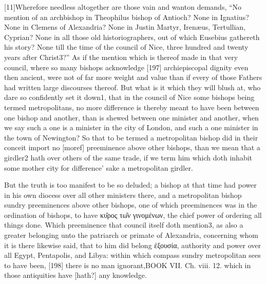 [11]Wherefore needless altogether are those vain and wanton demands, “No mention of an archbishop in Theophilus bishop of Antioch? None in Ignatius? None in Clemens of Alexandria? None in Justin Martyr, Irenæus, Tertullian, Cyprian? None in all those old historiographers, out of which Eusebius gathereth his story? None till the time of the council of Nice, three hundred and twenty years after Christ3?” As if the mention which is thereof made in that very council, where so many bishops acknowledge [197] archiepiscopal dignity even then ancient, were not of far more weight and value than if every of those Fathers had written large discourses thereof. But what is it which they will blush at, who dare so confidently set it down1, that in the council of Nice some bishops being termed metropolitans, no more difference is thereby meant to have been between one bishop and another, than is shewed between one minister and another, when we say such a one is a minister in the city of London, and such a one minister in the town of Newington? So that to be termed a metropolitan bishop did in their conceit import no [moref] preeminence above other bishops, than we mean that a girdler2 hath over others of the same trade, if we term him which doth inhabit some mother city for difference’ sake a metropolitan girdler.

But the truth is too manifest to be so deluded; a bishop at that time had power in his own diocess over all other ministers there, and a metropolitan bishop sundry preeminences above other bishops, one of which preeminences was in the ordination of bishops, to have κυ̑ρος τω̑ν γινομένων, the chief power of ordering all things done. Which preeminence that council itself doth mention3, as also a greater belonging unto the patriarch or primate of Alexandria, concerning whom it is there likewise said, that to him did belong ἐξουσία, authority and power over all Egypt, Pentapolis, and Libya: within which compass sundry metropolitan sees to have been, [198] there is no man ignorant,BOOK VII. Ch. viii. 12. which in those antiquities have [hath?] any knowledge.

